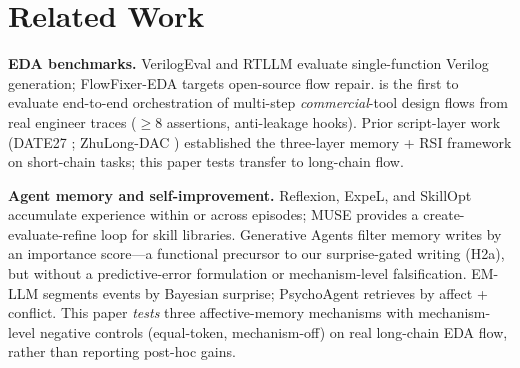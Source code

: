 \section{Related Work}
\label{sec:related}

\textbf{EDA benchmarks.} VerilogEval and RTLLM evaluate single-function Verilog generation; FlowFixer-EDA \cite{dong2026flowfixer} targets open-source flow repair. \bench{} is the first to evaluate end-to-end orchestration of multi-step \emph{commercial}-tool design flows from real engineer traces ($\geq$8 assertions, anti-leakage hooks). Prior script-layer work (DATE27 \cite{PLACEHOLDER_DATE27_ZHULONG}; ZhuLong-DAC \cite{liu2026runreadbackrefine}) established the three-layer memory + RSI framework on short-chain tasks; this paper tests transfer to long-chain flow.

\textbf{Agent memory and self-improvement.} Reflexion, ExpeL, and SkillOpt accumulate experience within or across episodes; MUSE provides a create-evaluate-refine loop for skill libraries. Generative Agents \cite{park2023} filter memory writes by an importance score---a functional precursor to our surprise-gated writing (H2a), but without a predictive-error formulation or mechanism-level falsification. EM-LLM segments events by Bayesian surprise; PsychoAgent retrieves by affect + conflict. This paper \emph{tests} three affective-memory mechanisms with mechanism-level negative controls (equal-token, mechanism-off) on real long-chain EDA flow, rather than reporting post-hoc gains.

